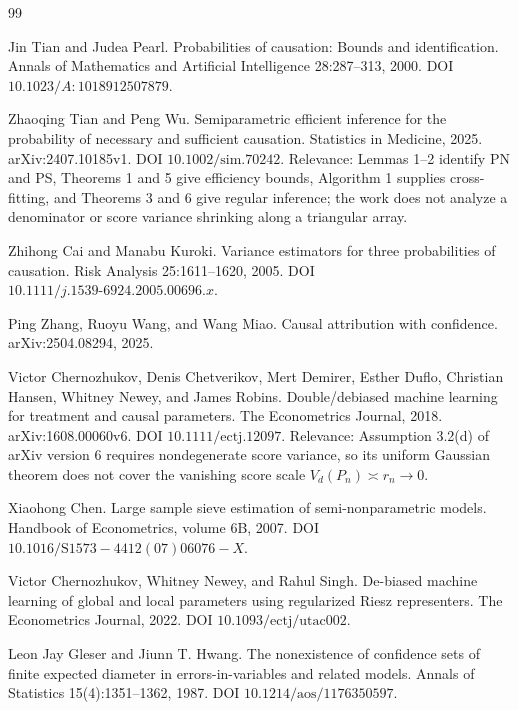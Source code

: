 \documentclass{article}
\begin{document}
\begin{thebibliography}{99}

   Jin Tian and Judea Pearl. Probabilities of causation: Bounds and identification. Annals of Mathematics and Artificial Intelligence 28:287--313, 2000. DOI \(10.1023/A:1018912507879\).

   Zhaoqing Tian and Peng Wu. Semiparametric efficient inference for the probability of necessary and sufficient causation. Statistics in Medicine, 2025. arXiv:2407.10185v1. DOI \(10.1002/\mathrm{sim}.70242\). Relevance: Lemmas 1--2 identify PN and PS, Theorems 1 and 5 give efficiency bounds, Algorithm 1 supplies cross-fitting, and Theorems 3 and 6 give regular inference; the work does not analyze a denominator or score variance shrinking along a triangular array.

   Zhihong Cai and Manabu Kuroki. Variance estimators for three probabilities of causation. Risk Analysis 25:1611--1620, 2005. DOI \(10.1111/j.1539\text{-}6924.2005.00696.x\).

   Ping Zhang, Ruoyu Wang, and Wang Miao. Causal attribution with confidence. arXiv:2504.08294, 2025.

   Victor Chernozhukov, Denis Chetverikov, Mert Demirer, Esther Duflo, Christian Hansen, Whitney Newey, and James Robins. Double/debiased machine learning for treatment and causal parameters. The Econometrics Journal, 2018. arXiv:1608.00060v6. DOI \(10.1111/\mathrm{ectj}.12097\). Relevance: Assumption 3.2(d) of arXiv version 6 requires nondegenerate score variance, so its uniform Gaussian theorem does not cover the vanishing score scale \(V_d(P_n)\asymp r_n\to0\).

   Xiaohong Chen. Large sample sieve estimation of semi-nonparametric models. Handbook of Econometrics, volume 6B, 2007. DOI \(10.1016/\mathrm{S1573-4412}(07)06076-X\).

   Victor Chernozhukov, Whitney Newey, and Rahul Singh. De-biased machine learning of global and local parameters using regularized Riesz representers. The Econometrics Journal, 2022. DOI \(10.1093/\mathrm{ectj}/\mathrm{utac002}\).

   Leon Jay Gleser and Jiunn T. Hwang. The nonexistence of confidence sets of finite expected diameter in errors-in-variables and related models. Annals of Statistics 15(4):1351--1362, 1987. DOI \(10.1214/\mathrm{aos}/1176350597\).


\end{thebibliography}
\end{document}

